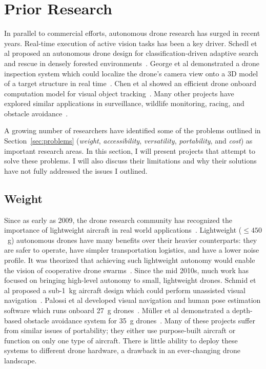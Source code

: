 \section{Prior Research}
\label{sec:prior-work}
In parallel to commercial efforts, autonomous drone research has surged in recent years. Real-time execution of active vision tasks has been a key driver. Schedl et al proposed an autonomous drone design for classification-driven adaptive search and rescue in densely forested environments~\cite{Schedl2021}. George et al demonstrated a drone inspection system which could localize the drone's camera view onto a 3D model of a target structure in real time~\cite{George2019}. Chen et al showed an efficient drone onboard computation model for visual object tracking~\cite{Chen2018}. Many other projects have explored similar applications in surveillance, wildlife monitoring, racing, and obstacle avoidance~\cite{Apvrille2014,Li2020,Devos2018,Alsalam2017,Ward2016}.  

A growing number of researchers have identified some of the problems outlined in Section~\ref{sec:problems} (\textit{weight}, \textit{accessibility}, \textit{versatility}, \textit{portability}, and \textit{cost}) as important research areas. In this section, I will present projects that attempt to solve these problems. I will also discuss their limitations and why their solutions have not fully addressed the issues I outlined.


\subsection{Weight}
Since as early as 2009, the drone research community has recognized the importance of lightweight aircraft in real world applications~\cite{Burkle2011, Burkle2009}. Lightweight ($\leq 450$~g) autonomous drones have many benefits over their heavier counterparts: they are safer to operate, have simpler transportation logistics, and have a lower noise profile. It was theorized that achieving such lightweight autonomy would enable the vision of cooperative drone swarms~\cite{Floreano2015}. Since the mid 2010s, much work has focused on bringing high-level autonomy to small, lightweight drones. Schmid et al proposed a sub-1~kg aircraft design which could perform unassisted visual navigation~\cite{Schmid2014}. Palossi et al developed visual navigation and human pose estimation software which runs onboard 27~g drones~\cite{Palossi2019,Palossi2021}. M{\"u}ller et al demonstrated a depth-based obstacle avoidance system for 35~g drones~\cite{Muller2023}. Many of these projects suffer from similar issues of portability; they either use purpose-built aircraft or function on only one type of aircraft. There is little ability to deploy these systems to different drone hardware, a drawback in an ever-changing drone landscape. 

